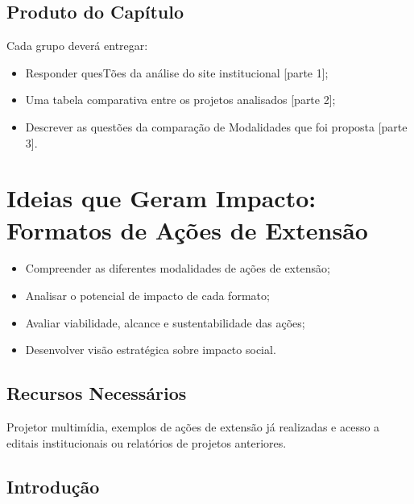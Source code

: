 \documentclass[12pt,a4paper]{article}
\begin{document}
\bigskip


\subsection*{Produto do Capítulo}

Cada grupo deverá entregar:

\begin{itemize}
    \item Responder quesTões da análise do site institucional [parte 1];
    \item Uma tabela comparativa entre os projetos analisados [parte 2];
    \item Descrever as questões da comparação de Modalidades que foi proposta [parte 3].
\end{itemize}


\newpage

\section{Ideias que Geram Impacto: Formatos de Ações de Extensão}

\begin{tcolorbox}[boxObjetivos]
\begin{itemize}
    \item Compreender as diferentes modalidades de ações de extensão;
    \item Analisar o potencial de impacto de cada formato;
    \item Avaliar viabilidade, alcance e sustentabilidade das ações;
    \item Desenvolver visão estratégica sobre impacto social.
\end{itemize}
\end{tcolorbox}

\subsection*{Recursos Necessários}

Projetor multimídia, exemplos de ações de extensão já realizadas e acesso a editais institucionais ou relatórios de projetos anteriores.

\subsection*{Introdução}
\end{document}
